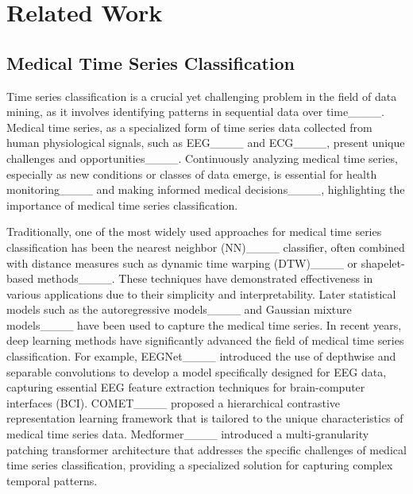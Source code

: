 \section{Related Work}
\subsection{Medical Time Series Classification}
Time series classification is a crucial yet challenging problem in the field of data mining, as it involves identifying patterns in sequential data over time____. 
Medical time series, as a specialized form of time series data collected from human physiological signals, such as EEG____ and ECG____, present unique challenges and opportunities____. Continuously analyzing medical time series, especially as new conditions or classes of data emerge, is essential for health monitoring____ and making informed medical decisions____, highlighting the importance of medical time series classification.

Traditionally, one of the most widely used approaches for medical time series classification has been the nearest neighbor (NN)____ classifier, often combined with distance measures such as dynamic time warping (DTW)____ or shapelet-based methods____. These techniques have demonstrated effectiveness in various applications due to their simplicity and interpretability. Later statistical models such as the autoregressive models____ and Gaussian mixture models____ have been used to capture the medical time series.
In recent years, deep learning methods have significantly advanced the field of medical time series classification. For example, EEGNet____ introduced the use of depthwise and separable convolutions to develop a model specifically designed for EEG data, capturing essential EEG feature extraction techniques for brain-computer interfaces (BCI). COMET____ proposed a hierarchical contrastive representation learning framework that is tailored to the unique characteristics of medical time series data. Medformer____ introduced a multi-granularity patching transformer architecture that addresses the specific challenges of medical time series classification, providing a specialized solution for capturing complex temporal patterns.

